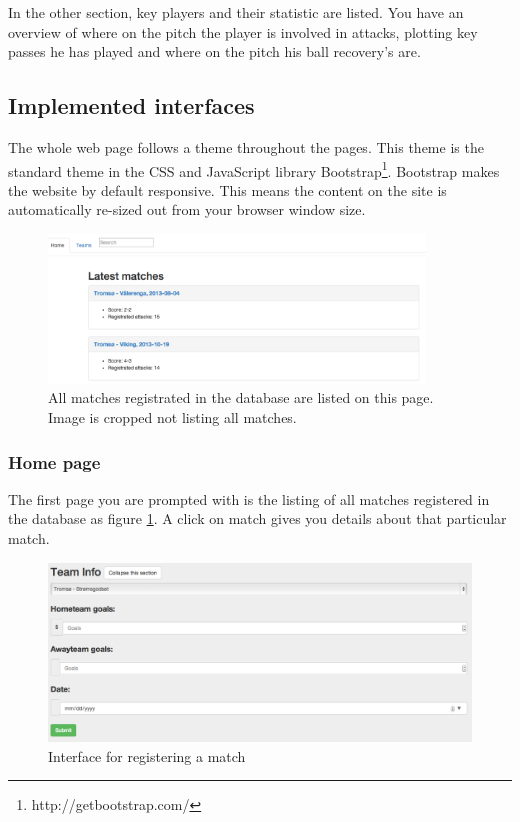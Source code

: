 In the other section, key players and their statistic are listed. You have an overview of where on the pitch the player is involved in attacks, plotting key passes he has played and where on the pitch his ball recovery's are.


\subsection{Implemented interfaces}

The whole web page follows a theme throughout the pages. This theme is the standard theme in the \ac{CSS} and JavaScript library Bootstrap\footnote{ http://getbootstrap.com/}. Bootstrap makes the website by default responsive. This means the content on the site is automatically re-sized out from your browser window size.

\begin{figure}[ht!]
\centering
\includegraphics[width=100mm]{images/interfaces/all_matches.png}
\caption{All matches registrated in the database are listed on this page. Image is cropped not listing all matches.}
\label{fig:all_matches}
\end{figure}

\subsubsection{Home page}
The first page you are prompted with is the listing of all matches registered in the database as figure \ref{fig:all_matches}. A click on match gives you details about that particular match.

\begin{figure}[ht!]
\centering
\includegraphics[width=1\textwidth]{images/demo/reg_match.png}
\caption{Interface for registering a match}
\label{fig:reg_match}
\end{figure}



